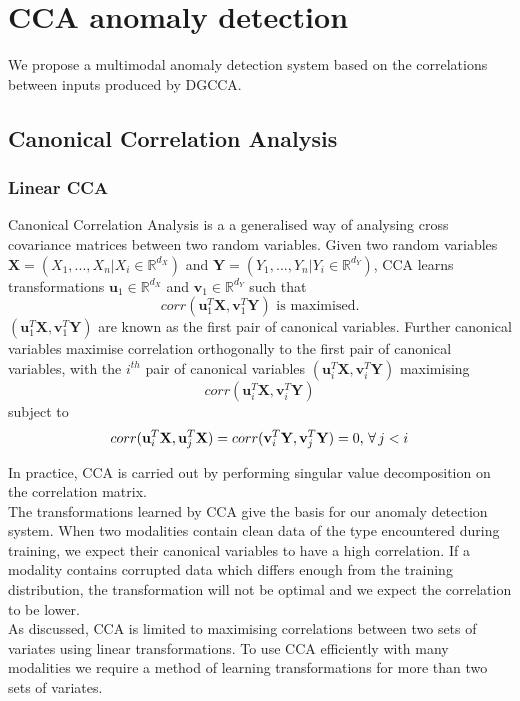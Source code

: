 \chapter{CCA anomaly detection}

We propose a multimodal anomaly detection system based on the correlations between inputs produced by DGCCA.

\section{Canonical Correlation Analysis}
\subsection{Linear CCA}
Canonical Correlation Analysis \cite{CCA} is a a generalised way of analysing cross covariance matrices between two random variables. Given two random variables $\mathbf{X}=(X_1,...,X_n | X_i\in\mathbb{R}^{d_X})$ and $\mathbf{Y}=(Y_1,...,Y_n | Y_i\in\mathbb{R}^{d_Y})$, CCA learns transformations $\mathbf{u}_1\in\mathbb{R}^{d_X}$ and $\mathbf{v}_1\in\mathbb{R}^{d_Y}$ such that $$corr(\mathbf{u}_1^T\mathbf{X}, \mathbf{v}_1^T\mathbf{Y}) \textrm{ is maximised.}$$ $(\mathbf{u}_1^T\mathbf{X}, \mathbf{v}_1^T\mathbf{Y})$ are known as the first pair of canonical variables. Further canonical variables maximise correlation orthogonally to the first pair of canonical variables, with the $i^{th}$ pair of canonical variables $(\mathbf{u}_i^T\mathbf{X}, \mathbf{v}_i^T\mathbf{Y})$ maximising $$corr(\mathbf{u}_i^T\mathbf{X}, \mathbf{v}_i^T\mathbf{Y})$$ subject to $$corr(\mathbf{u}_i^T\mathbf{X}, \mathbf{u}_j^T\mathbf{X}) = corr(\mathbf{v}_i^T\mathbf{Y}, \mathbf{v}_j^T\mathbf{Y}) = 0,\thinspace  \forall \thinspace  j<i$$

In practice, CCA is carried out by performing singular value decomposition on the correlation matrix. \\

The transformations learned by CCA give the basis for our anomaly detection system. When two modalities contain clean data of the type encountered during training, we expect their canonical variables to have a high correlation. If a modality contains corrupted data which differs enough from the training distribution, the transformation will not be optimal and we expect the correlation to be lower.\\

As discussed, CCA is limited to maximising correlations between two sets of variates using linear transformations. To use CCA efficiently with many modalities we require a method of learning transformations for more than two sets of variates.

